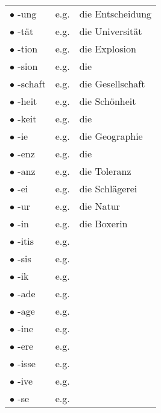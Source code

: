 \documentclass[a4paper,twocolumn,10pt]{article}
\begin{document}
\begin{xtabular}{l r l}

  $\bullet$ -ung    & e.g. & die Entscheidung \\
  $\bullet$ -tät    & e.g. & die Universität  \\
  $\bullet$ -tion   & e.g. & die Explosion    \\
  $\bullet$ -sion   & e.g. & die              \\
  $\bullet$ -schaft & e.g. & die Gesellschaft \\
  $\bullet$ -heit   & e.g. & die Schönheit    \\
  $\bullet$ -keit   & e.g. & die              \\
  $\bullet$ -ie     & e.g. & die Geographie   \\
  $\bullet$ -enz    & e.g. & die              \\
  $\bullet$ -anz    & e.g. & die Toleranz     \\
  $\bullet$ -ei     & e.g. & die Schlägerei   \\
  $\bullet$ -ur     & e.g. & die Natur        \\
  $\bullet$ -in     & e.g. & die Boxerin      \\
  $\bullet$ -itis   & e.g. & \\
  $\bullet$ -sis    & e.g. & \\
  $\bullet$ -ik     & e.g. & \\
  $\bullet$ -ade    & e.g. & \\
  $\bullet$ -age    & e.g. & \\
  $\bullet$ -ine    & e.g. & \\
  $\bullet$ -ere    & e.g. & \\
  $\bullet$ -isse   & e.g. & \\
  $\bullet$ -ive    & e.g. & \\
  $\bullet$ -se     & e.g. & \\

\end{xtabular}

\vspace{0.2cm}

\linenumbers
\end{document}
